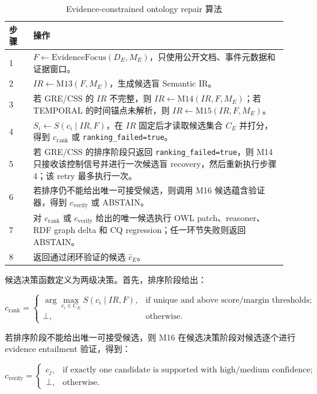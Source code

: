 \documentclass[11pt]{article}
\begin{document}
\begin{table}[t]
\centering
\caption{Evidence-constrained ontology repair 算法}
\label{tab:algorithm}
\begin{tabular}{p{0.08\linewidth}p{0.84\linewidth}}
\toprule
步骤 & 操作 \\
\midrule
1 & $F \leftarrow \mathrm{EvidenceFocus}(D_E, M_E)$，只使用公开文档、事件元数据和证据窗口。 \\
2 & $IR \leftarrow \mathrm{M13}(F, M_E)$，生成候选盲 Semantic IR。 \\
3 & 若 GRE/CSS 的 $IR$ 不完整，则 $IR \leftarrow \mathrm{M14}(IR,F,M_E)$；若 TEMPORAL 的时间锚点未解析，则 $IR \leftarrow \mathrm{M15}(IR,F,M_E)$。 \\
4 & $S_i \leftarrow S(c_i \mid IR,F)$，在 $IR$ 固定后才读取候选集合 $C_E$ 并打分，得到 $c_{\mathrm{rank}}$ 或 \texttt{ranking\_failed=true}。 \\
5 & 若 GRE/CSS 的排序阶段只返回 \texttt{ranking\_failed=true}，则 M14 只接收该控制信号并进行一次候选盲 recovery，然后重新执行步骤 4；该 retry 最多执行一次。 \\
6 & 若排序仍不能给出唯一可接受候选，则调用 M16 候选蕴含验证器，得到 $c_{\mathrm{verify}}$ 或 ABSTAIN。 \\
7 & 对 $c_{\mathrm{rank}}$ 或 $c_{\mathrm{verify}}$ 给出的唯一候选执行 OWL patch、reasoner、RDF graph delta 和 CQ regression；任一环节失败则返回 ABSTAIN。 \\
8 & 返回通过闭环验证的候选 $\hat{c}_E$。 \\
\bottomrule
\end{tabular}
\end{table}

候选决策函数定义为两级决策。首先，排序阶段给出：

\[
c_{\mathrm{rank}} =
\begin{cases}
\arg\max_{c_i\in C_E} S(c_i\mid IR,F), & \text{if unique and above score/margin thresholds};\\
\bot, & \text{otherwise}.
\end{cases}
\]

若排序阶段不能给出唯一可接受候选，则 M16 在候选决策阶段对候选逐个进行 evidence entailment 验证，得到：

\[
c_{\mathrm{verify}} =
\begin{cases}
c_j, & \text{if exactly one candidate is supported with high/medium confidence};\\
\bot, & \text{otherwise}.
\end{cases}
\]
\end{document}

